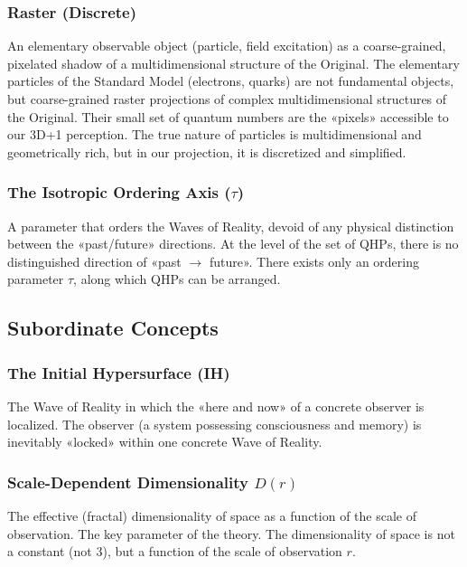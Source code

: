\documentclass[a4paper,12pt]{article}
\begin{document}
	\subsubsection{Raster (Discrete)}
	
	An elementary observable object (particle, field excitation) as a coarse-grained, pixelated shadow of a multidimensional structure of the Original. The elementary particles of the Standard Model (electrons, quarks) are not fundamental objects, but coarse-grained raster projections of complex multidimensional structures of the Original. Their small set of quantum numbers are the «pixels» accessible to our 3D+1 perception. The true nature of particles is multidimensional and geometrically rich, but in our projection, it is discretized and simplified.
	
	\subsubsection{The Isotropic Ordering Axis ($\tau$)}
	
	A parameter that orders the Waves of Reality, devoid of any physical distinction between the «past/future» directions. At the level of the set of QHPs, there is no distinguished direction of «past $\to$ future». There exists only an ordering parameter $\tau$, along which QHPs can be arranged.
	
	\subsection{Subordinate Concepts}
	
	\subsubsection{The Initial Hypersurface (IH)}
	
	The Wave of Reality in which the «here and now» of a concrete observer is localized. The observer (a system possessing consciousness and memory) is inevitably «locked» within one concrete Wave of Reality.
	
	\subsubsection{Scale-Dependent Dimensionality $D(r)$}
	
	The effective (fractal) dimensionality of space as a function of the scale of observation. The key parameter of the theory. The dimensionality of space is not a constant (not 3), but a function of the scale of observation $r$.
	
\end{document}
